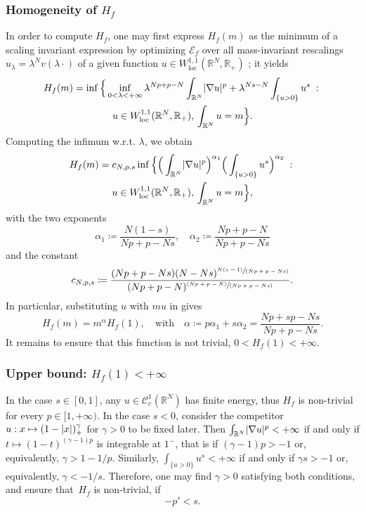 \documentclass[10pt]{amsart}
\newcommand{\spfrac}[2]{{\sfrac{#1}{(#2)}}}
\newcommand{\pspfrac}[2]{{\sfrac{(#1)}{(#2)}}}
\theoremstyle{plain}
\theoremstyle{definition}
\newcommand{\R}{\mathbb{R}}
\newcommand{\Cspace}{\mathscr{C}}
\newcommand{\ener}{\mathcal{E}}
\newcommand{\loc}{\mathrm{loc}}
\newcommand{\st}{\;:\;}
\DeclarePairedDelimiter{\abs}{\lvert}{\rvert}
\begin{document}
\subsubsection*{Homogeneity of $H_f$}
In order to compute $H_f$, one may first express $H_f(m)$ as the minimum of a scaling invariant expression by optimizing $\ener_f$ over all mass-invariant rescalings $u_\lambda = \lambda^N v(\lambda \cdot)$ of a given function $u\in W^{1,1}_{\loc}(\R^N,\R_+)$ ; it yields\vspace*{-3pt}
\begin{multline}\label{rescalingCost}
H_f(m)=\inf\Big\{\inf_{0<\lambda<+\infty}\lambda^{Np+p-N}\int_{\R^N}\abs{\nabla u}^p +\lambda^{Ns-N}\int_{\{u>0\}}u^s\st\\ u\in W^{1,1}_{\loc}(\R^N,\R_+),\,\int_{\R^N}u=m\Big\}.
\end{multline}
Computing the infimum w.r.t. $\lambda$, we obtain\vspace*{-3pt}
\begin{multline}\label{scaleInvariantCost}
H_f(m)=c_{N,p,s}\inf\Big\{\Big(\int_{\R^N}\abs{\nabla u}^p\Big)^{\alpha_1}\Big(\int_{\{u>0\}}u^s\Big)^{\alpha_2}\st \\u\in W^{1,1}_{\loc}(\R^N,\R_+),\,\int_{\R^N}u=m\Big\},
\end{multline}
with the two exponents\vspace*{-3pt}
\[
\alpha_1\coloneqq \frac{N(1-s)}{Np+p-Ns},\quad
\alpha_2\coloneqq \frac{Np+p-N}{Np+p-Ns}
\]
and the constant\vspace*{-3pt}
\[
c_{N,p,s} \coloneqq \frac{(Np+p-Ns)(N-Ns)^{\spfrac{N(s-1)}{Np+p-Ns}}}{(Np+p-N)^{\pspfrac{Np+p-N}{Np+p-Ns}}}.
\]
In particular, substituting $u$ with $mu$ in  gives\vspace*{-3pt}
\begin{equation}
\label{alphaCost}
H_f(m)=m^\alpha H_f(1),\quad\text{with} \quad\alpha\coloneqq p\alpha_1+s\alpha_2=\frac{Np+sp-Ns}{Np+p-Ns}.
\end{equation}
It remains to ensure that this function is not trivial, \ie $0<H_f(1)<+\infty$.

\subsubsection*{Upper bound: $H_f(1)<+\infty$}
In the case $s\in [0,1]$, any $u\in\Cspace_c^1(\R^N)$ has finite energy, thus $H_f$ is non-trivial for every $p\in [1,+\infty)$. In the case $s< 0$, consider the competitor $u :x \mapsto (1-\abs{x})_+^\gamma$ for $\gamma > 0$ to be fixed later. Then $\int_{\R^N} \abs{\nabla u}^p < +\infty$ if and only if $t \mapsto (1-t)^{(\gamma-1)p}$ is integrable at $1^-$, that is if $(\gamma-1)p > -1$ or, equivalently, $ \gamma > 1- 1/p$. Similarly, $\int_{\{u>0\}} u^s < +\infty$ if and only if $\gamma s > -1$ or, equivalently, $\gamma < -1/s$. Therefore, one may find $\gamma > 0$ satisfying both conditions, and ensure that~$H_{f}$ is non-trivial, if
\[-p'<s.\]
\end{document}
